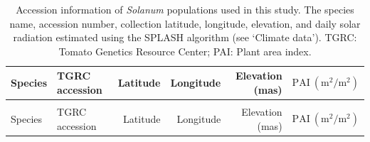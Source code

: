 \documentclass[
  letterpaper,
  DIV=11,
  numbers=noendperiod]{scrartcl}
\begin{document}
\begin{longtable}{>{\raggedright\arraybackslash}p{3.25cm}lrrrr}

\caption{\label{tbl-populations}Accession information of \emph{Solanum}
populations used in this study. The species name, accession number,
collection latitude, longitude, elevation, and daily solar radiation
estimated using the SPLASH algorithm (see `Climate data'). TGRC: Tomato
Genetics Resource Center; PAI: Plant area index.}

\tabularnewline

\toprule
Species & TGRC accession & Latitude & Longitude & Elevation (mas) & $\mathrm{PAI}~(\unit{\meter\squared\per\meter\squared})$\\
\midrule
\endfirsthead
\multicolumn{6}{@{}l}{\textit{(continued)}}\\
\toprule
Species & TGRC accession & Latitude & Longitude & Elevation (mas) & $\mathrm{PAI}~(\unit{\meter\squared\per\meter\squared})$\\
\midrule
\endhead


\end{longtable}
\end{document}
